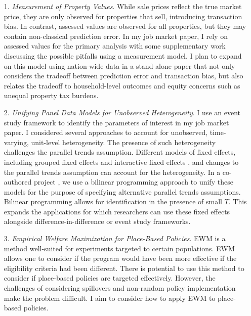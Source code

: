 \begin{enumerate}
\item[1.] \textit{Measurement of Property Values}. While sale prices reflect the true market price, they are only observed for properties that sell, introducing transaction bias. In contrast, assessed values are observed for all properties, but they may contain non-classical prediction error. In my job market paper, I rely on assessed values for the primary analysis with some supplementary work discussing the possible pitfalls using a measurement model. I plan to expand on this model using nation-wide data in a stand-alone paper that not only considers the tradeoff between prediction error and transaction bias, but also relates the tradeoff to household-level outcomes and equity concerns such as unequal property tax burdens. 

\item[2.] \textit{Unifying Panel Data Models for Unobserved Heterogeneity}. I use an event study framework to identify the parameters of interest in my job market paper. I considered several approaches to account for unobserved, time-varying, unit-level heterogeneity. The presence of such heterogeneity challenges the parallel trends assumption. Different models of fixed effects, including grouped fixed effects and interactive fixed effects \citep{bai_panel_2009,bonhomme_grouped_2015}, and changes to the parallel trends assumption can account for the heterogeneity. In a co-authored project \citep{shea_unifying_2023}, we use a bilinear programming approach to unify these models for the purpose of specifying alternative parallel trends assumptions. Bilinear programming allows for identification in the presence of small $T$. This expands the applications for which researchers can use these fixed effects alongside difference-in-difference or event study frameworks. 

\item[3.] \textit{Empirical Welfare Maximization for Place-Based Policies}. EWM \citep{kitagawa_who_2018} is a method well-suited for experiments targeted to certain populations. EWM allows one to consider if the program would have been more effective if the eligibility criteria had been different. There is potential to use this method to consider if place-based policies are targeted effectively. However, the challenges of considering spillovers and non-random policy implementation make the problem difficult. I aim to consider how to apply EWM to place-based policies. 
\end{enumerate}


\singlespacing





